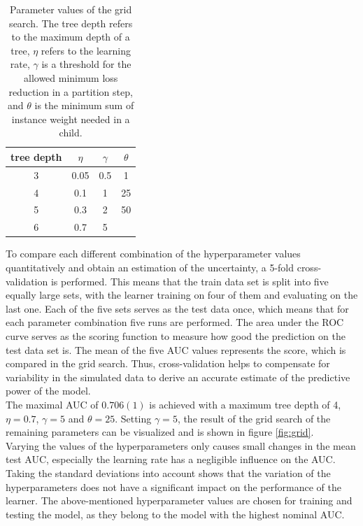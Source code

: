   \begin{table}
    \centering
    \begin{tabular}{c c c c}
      \toprule
      tree depth & $\eta$ & $\gamma$ & $\theta$ \\
      \midrule
      3 & 0.05 & 0.5 & 1  \\
      4 & 0.1  & 1   & 25  \\
      5 & 0.3  & 2 & 50  \\
      6 & 0.7  & 5   &  \\
    \end{tabular}
    \caption{Parameter values of the grid search. The tree depth refers to the maximum depth of a tree, $\eta$ refers to the learning rate,
    $\gamma$ is a threshold for the allowed minimum loss reduction in a partition step, and $\theta$ is the minimum sum of instance weight needed in a child.}
    \label{tab:grid}
  \end{table}
To compare each different combination of the hyperparameter values quantitatively and obtain an estimation of the uncertainty, a 5-fold cross-validation is performed. This means that
the train data set is split into five equally
large sets, with the learner training on four of them and evaluating on the last one. Each of the five sets serves as the test data once, which means that for each
parameter combination five runs are performed. The area under the ROC curve serves as the scoring function to measure how good the prediction on the test data set is.
The mean of the five AUC values represents the score, which is compared in the grid search. Thus, cross-validation helps to compensate for variability in the simulated
data to derive an accurate estimate of the predictive power of the model. \\
The maximal AUC of $0.706(1)$ is achieved with a maximum tree depth of 4, $\eta=0.7$, $\gamma=5$ and $\theta=25$. Setting $\gamma=5$, the result of the grid search of the remaining
parameters can be visualized and is shown in figure \ref{fig:grid}. \\
Varying the values of the hyperparameters only causes small changes in the mean test AUC, especially the learning rate has a negligible influence on the AUC. Taking the
standard deviations into account shows that the variation of the hyperparameters does not have a significant impact on the performance of the learner.
The above-mentioned hyperparameter values are chosen for training and testing the model, as they belong to  the model with the highest nominal AUC.

